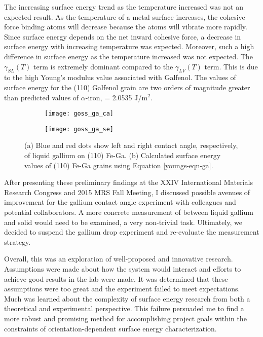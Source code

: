  The increasing surface energy trend as the temperature increased was not an expected result. As the temperature of a metal surface increases, the cohesive force binding atoms will decrease because the atoms will vibrate more rapidly. Since surface energy depends on the net inward cohesive force, a decrease in surface energy with increasing temperature was expected. Moreover, such a high difference in surface energy as the temperature increased was not expected. The $ \gamma_{SL}(T) $ term is extremely dominant compared to the $ \gamma_{LV}(T) $ term. This is due to the high Young's modulus value associated with Galfenol. The values of surface energy for the \hkl(110) Galfenol grain are two orders of magnitude greater than predicted values of $\alpha$-iron, \gamSV = 2.0535 J/m$^2$.\cite{Wang2000} 
\begin{figure}[h]
	\centering
	\begin{subfigure}[c]{0.47\textwidth}
		\texttt{[image: goss\_ga\_ca]}
		\subcaption{~}
		\label{fig:goss_ga_ca}		
	\end{subfigure}
	\begin{subfigure}[c]{0.47\textwidth} 
		\texttt{[image: goss\_ga\_se]}
		\subcaption{~}
		\label{fig:goss_ga_se}		
	\end{subfigure}
	\caption{(a) Blue and red dots show left and right contact angle, respectively, of liquid gallium on \hkl(110) Fe-Ga. (b) Calculated surface energy values of \hkl(110) Fe-Ga grains using Equation \ref{youngs-eqn-ga}.}
	\label{fig:goss_se_msrmnt}
\end{figure}
 After presenting these preliminary findings at the XXIV International Materials Research Congress and 2015 MRS Fall Meeting,\cite{VanOrder2015a,VanOrder2015} I discussed possible avenues of improvement for the gallium contact angle experiment with colleagues and potential collaborators. A more concrete measurement of \gamSL between liquid gallium and solid would need to be examined, a very non-trivial task. Ultimately, we decided to suspend the gallium drop experiment and re-evaluate the measurement strategy. 
 
Overall, this was an exploration of well-proposed and innovative research. Assumptions were made about how the system would interact and efforts to achieve good results in the lab were made. It was determined that these assumptions were too great and the experiment failed to meet expectations. Much was learned about the complexity of surface energy research from both a theoretical and experimental perspective. This failure persuaded me to find a more robust and promising method for accomplishing project goals within the constraints of orientation-dependent surface energy characterization. 


